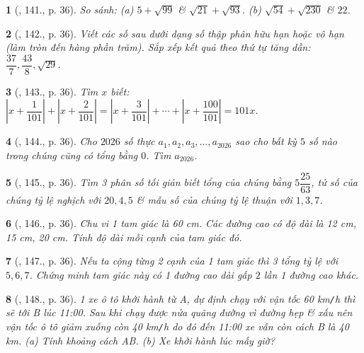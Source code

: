 \documentclass{article}
\newtheorem{baitoan}{}
\begin{document}
\begin{baitoan}[\cite{Tuyen_Toan_7}, 141., p. 36]
	So sánh: (a) $5 + \sqrt{99}$ \& $\sqrt{21} + \sqrt{93}$. (b) $\sqrt{54} + \sqrt{230}$ \& $22$.	
\end{baitoan}

\begin{baitoan}[\cite{Tuyen_Toan_7}, 142., p. 36]
	Viết các số sau dưới dạng số thập phân hữu hạn hoặc vô hạn (làm tròn đến hàng phần trăm). Sắp xếp kết quả theo thứ tự tăng dần: $\dfrac{37}{7},\dfrac{43}{8},\sqrt{29}$.
\end{baitoan}

\begin{baitoan}[\cite{Tuyen_Toan_7}, 143., p. 36]
	Tìm $x$ biết: $\left|x + \dfrac{1}{101}\right| + \left|x + \dfrac{2}{101}\right| = \left|x + \dfrac{3}{101}\right| + \cdots + \left|x + \dfrac{100}{101}\right| = 101x$.
\end{baitoan}

\begin{baitoan}[\cite{Tuyen_Toan_7}, 144., p. 36]
	Cho $2026$ số thực $a_1,a_2,a_3,\ldots,a_{2026}$ sao cho bất kỳ $5$ số nào trong chúng cũng có tổng bằng $0$. Tìm $a_{2026}$.
\end{baitoan}

\begin{baitoan}[\cite{Tuyen_Toan_7}, 145., p. 36]
	Tìm 3 phân số tối giản biết tổng của chúng bằng $5\dfrac{25}{63}$, tử số của chúng tỷ lệ nghịch với $20,4,5$ \& mẫu số của chúng tỷ lệ thuận với $1,3,7$.
\end{baitoan}

\begin{baitoan}[\cite{Tuyen_Toan_7}, 146., p. 36]
	Chu vi 1 tam giác là {\rm60 cm}. Các đường cao có độ dài là {\rm12 cm, 15 cm, 20 cm}. Tính độ dài mỗi cạnh của tam giác đó.
\end{baitoan}

\begin{baitoan}[\cite{Tuyen_Toan_7}, 147., p. 36]
	Nếu ta cộng từng 2 cạnh của 1 tam giác thì 3 tổng tỷ lệ với $5,6,7$. Chứng minh tam giác này có 1 đường cao dài gấp $2$ lần 1 đường cao khác.
\end{baitoan}

\begin{baitoan}[\cite{Tuyen_Toan_7}, 148., p. 36]
	1 xe ô tô khởi hành từ A, dự định chạy với vận tốc {\rm60 km{\tt/}h} thì sẽ tới B lúc 11:00. Sau khi chạy được nửa quãng đường vì đường hẹp \& xấu nên vận tốc ô tô giảm xuống còn {\rm40 km{\tt/}h} do đó đến 11:00 xe vẫn còn cách B là {\rm40 km}. (a) Tính khoảng cách AB. (b) Xe khởi hành lúc mấy giờ?
\end{baitoan}
\end{document}
